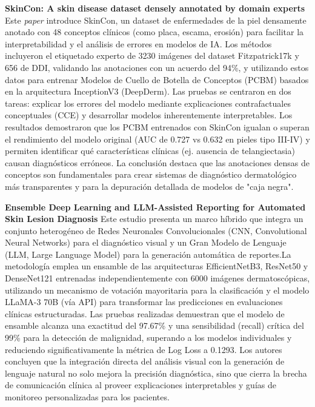 \documentclass[11pt, a4paper]{article}
\begin{document}
\textbf{SkinCon: A skin disease dataset densely annotated by domain experts} \cite{daneshjou_skincon_nodate}
Este \textit{paper} introduce SkinCon, un dataset de enfermedades de la piel densamente anotado con 48 conceptos clínicos (como placa, escama, erosión) para facilitar la interpretabilidad y el análisis de errores
en modelos de IA. Los métodos incluyeron el etiquetado experto de 3230 imágenes del dataset Fitzpatrick17k y 656 de DDI, validando las anotaciones con un acuerdo del 94\%, y utilizando estos datos para entrenar 
Modelos de Cuello de Botella de Conceptos (PCBM) basados en la arquitectura InceptionV3 (DeepDerm). Las pruebas se centraron en dos tareas: explicar los errores del modelo mediante explicaciones contrafactuales
conceptuales (CCE) y desarrollar modelos inherentemente interpretables. Los resultados demostraron que los PCBM entrenados con SkinCon igualan o superan el rendimiento del modelo original (AUC de 0.727 vs 0.632
en pieles tipo III-IV) y permiten identificar qué características clínicas (ej. ausencia de telangiectasia) causan diagnósticos erróneos. La conclusión destaca que las anotaciones densas de conceptos son fundamentales
para crear sistemas de diagnóstico dermatológico más transparentes y para la depuración detallada de modelos de "caja negra".

\textbf{Ensemble Deep Learning and LLM-Assisted Reporting for Automated Skin Lesion Diagnosis} \cite{khan_ensemble_2025}
Este estudio presenta un marco híbrido que integra un conjunto heterogéneo de Redes Neuronales Convolucionales (CNN, Convolutional Neural Networks) para el diagnóstico visual y un Gran Modelo de Lenguaje (LLM, Large
Language Model) para la generación automática de reportes.La metodología emplea un ensamble de las arquitecturas EfficientNetB3, ResNet50 y DenseNet121 entrenadas independientemente con 6000 imágenes dermatoscópicas,
utilizando un mecanismo de votación mayoritaria para la clasificación y el modelo LLaMA-3 70B (vía API) para transformar las predicciones en evaluaciones clínicas estructuradas. Las pruebas realizadas demuestran que
el modelo de ensamble alcanza una exactitud del 97.67\% y una sensibilidad (recall) crítica del 99\% para la detección de malignidad, superando a los modelos individuales y reduciendo significativamente la métrica
de Log Loss a 0.1293. Los autores concluyen que la integración directa del análisis visual con la generación de lenguaje natural no solo mejora la precisión diagnóstica, sino que cierra la brecha de comunicación
clínica al proveer explicaciones interpretables y guías de monitoreo personalizadas para los pacientes.
\end{document}
